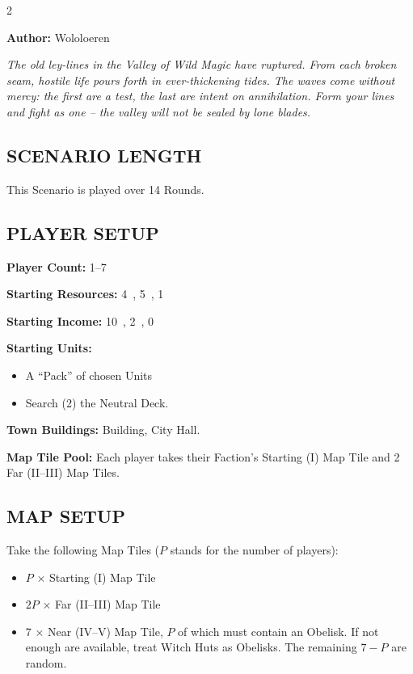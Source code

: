
\begin{multicols}{2}

\textbf{Author:} Wololoeren

\textit{The old ley-lines in the Valley of Wild Magic have ruptured.
From each broken seam, hostile life pours forth in ever-thickening tides.
The waves come without mercy: the first are a test, the last are intent on annihilation.
Form your lines and fight as one -- the valley will not be sealed by lone blades.}

\subsection*{\MakeUppercase{Scenario Length}}

This Scenario is played over 14 Rounds.

\subsection*{\MakeUppercase{Player Setup}}

\textbf{Player Count:} 1--7

\textbf{Starting Resources:} 4~, 5~, 1~

\textbf{Starting Income:} 10~, 2~, 0~

\textbf{Starting Units:}
\begin{itemize}
  \item A ``Pack'' of chosen  Units
  \item Search (2) the  Neutral Deck.
\end{itemize}

\textbf{Town Buildings:}  Building, City Hall.

\textbf{Map Tile Pool:} Each player takes their Faction's Starting (I) Map Tile and 2 Far (II--III) Map Tiles.

\subsection*{\MakeUppercase{Map Setup}}

Take the following Map Tiles ($P$ stands for the number of players):

\begin{itemize}
  \item $P$ × Starting (I) Map Tile
  \item $2P$ × Far (II--III) Map Tile
  \item 7 × Near (IV--V) Map Tile, $P$ of which must contain an Obelisk.
    If not enough are available, treat Witch Huts as Obelisks.
    The remaining $7 - P$ are random.
\end{itemize}


\end{multicols}
